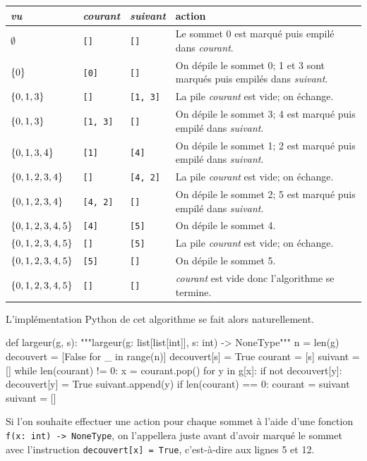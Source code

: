 \documentclass{magnolia}
\begin{document}
\begin{center}
\begin{tabular}{l|l|l|l}
\emph{vu} & \emph{courant} & \emph{suivant} & action\\
\hline
$\emptyset$ &\verb![]! & \verb![]! & Le sommet 0 est marqué puis empilé dans \emph{courant}.\\
$\left\{0\right\}$ &\verb![0]! & \verb![]! &  On dépile le sommet 0; 1 et 3 sont marqués puis empilés dans \emph{suivant}.\\
$\left\{0, 1, 3\right\}$ &\verb![]!   & \verb![1, 3]! & La pile \emph{courant} est vide; on échange.\\
$\left\{0, 1, 3\right\}$ &\verb![1, 3]! &  \verb![]! & On dépile le sommet 3; 4 est marqué puis empilé dans \emph{suivant}.\\
$\left\{0, 1, 3, 4\right\}$&\verb![1]! & \verb![4]! & On dépile le sommet 1; 2 est marqué puis empilé dans \emph{suivant}.\\
$\left\{0, 1, 2, 3, 4\right\}$&\verb![]!   & \verb![4, 2]! & La pile \emph{courant} est vide; on échange.\\
$\left\{0, 1, 2, 3, 4\right\}$&\verb![4, 2]! & \verb![]!  & On dépile le sommet 2; 5 est marqué puis empilé dans \emph{suivant}.\\
$\left\{0, 1, 2, 3, 4, 5\right\}$&\verb![4]! & \verb![5]!  & On dépile le sommet 4.\\
$\left\{0, 1, 2, 3, 4, 5\right\}$&\verb![]! &  \verb![5]! & La pile \emph{courant} est vide; on échange.\\
$\left\{0, 1, 2, 3, 4, 5\right\}$&\verb![5]! &  \verb![]! & On dépile le sommet 5.\\
$\left\{0, 1, 2, 3, 4, 5\right\}$&\verb![]!  &  \verb![]! &  \emph{courant} est vide donc
l'algorithme se termine.
\end{tabular}
\end{center}

\noindent
L'implémentation Python de cet algorithme se fait alors naturellement.

\begin{pythoncodeline}
def largeur(g, s):
    """largeur(g: list[list[int]], s: int) -> NoneType"""
    n = len(g)
    decouvert = [False for _ in range(n)]
    decouvert[s] = True
    courant = [s]
    suivant = []
    while len(courant) != 0:
        x = courant.pop()
        for y in g[x]:
            if not decouvert[y]:
                decouvert[y] = True
                suivant.append(y)
        if len(courant) == 0:
            courant = suivant
            suivant = []
\end{pythoncodeline}
\noindent
Si l'on souhaite effectuer une action pour chaque sommet à l'aide d'une fonction
\verb!f(x: int) -> NoneType!, on l'appellera juste avant d'avoir marqué le sommet
avec l'instruction \verb!decouvert[x] = True!, c'est-à-dire aux lignes 5 et 12.\\
\end{document}
